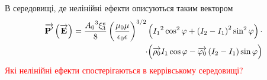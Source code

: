 %
В середовищі, де нелінійні ефекти описуються таким вектором
%
\textcolor{lightgray}{ \begin{equation*} \begin{aligned}
\overrightarrow{\mathbf P^\prime} \left( \overrightarrow{\mathbf E} \right) = 
\frac{ {A_0}^3 \xi_3^e }{ 8 } \left( \frac{\mu_0 \mu}
{\epsilon_0 \epsilon} \right)^{3/2} \left( {I_1}^2 \cos^2 \varphi + 
\left( I_2 - I_1 \right)^2 \sin^2 \varphi \right) \cdot \\ 
\cdot \Big( \overrightarrow{\mathbf \rho_0} I_1 \cos \varphi - 
\overrightarrow{\mathbf  \varphi_0 } \left( I_2 - I_1 \right) \sin \varphi \Big)
\end{aligned} \end{equation*} }
%
\textcolor{red}{ Які нелінійні ефекти спостерігаються в керрівському середовищі?}

